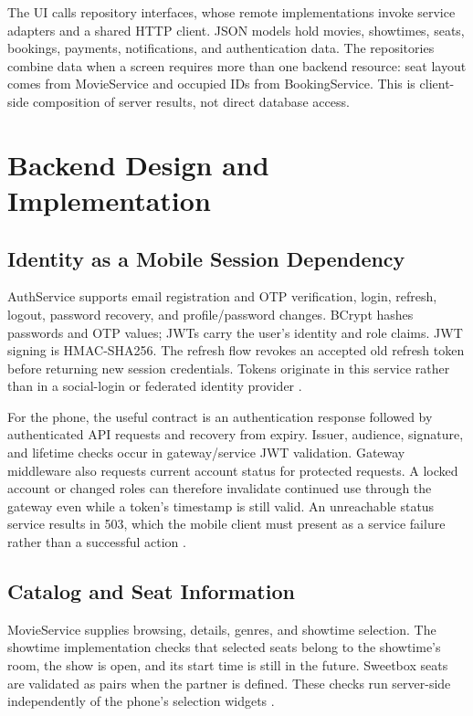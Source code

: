 \documentclass[conference]{IEEEtran}
\begin{document}
The UI calls repository interfaces, whose remote implementations invoke service
adapters and a shared HTTP client. JSON models hold movies, showtimes, seats,
bookings, payments, notifications, and authentication data. The repositories
combine data when a screen requires more than one backend resource: seat
layout comes from MovieService and occupied IDs from BookingService. This is
client-side composition of server results, not direct database access.

\section{Backend Design and Implementation}
\subsection{Identity as a Mobile Session Dependency}
AuthService supports email registration and OTP verification, login, refresh,
logout, password recovery, and profile/password changes. BCrypt hashes
passwords and OTP values; JWTs carry the user's identity and role claims.
JWT signing is HMAC-SHA256. The refresh flow revokes an accepted old refresh
token before returning new session credentials. Tokens originate in this
service rather than in a social-login or federated identity provider
\cite{auth}.

For the phone, the useful contract is an authentication response followed by
authenticated API requests and recovery from expiry. Issuer, audience,
signature, and lifetime checks occur in gateway/service JWT validation.
Gateway middleware also requests current account status for protected
requests. A locked account or changed roles can therefore invalidate continued
use through the gateway even while a token's timestamp is still valid. An
unreachable status service results in 503, which the mobile client must present
as a service failure rather than a successful action \cite{gateway,jwt}.

\subsection{Catalog and Seat Information}
MovieService supplies browsing, details, genres, and showtime selection. The
showtime implementation checks that selected seats belong to the showtime's
room, the show is open, and its start time is still in the future. Sweetbox
seats are validated as pairs when the partner is defined. These checks run
server-side independently of the phone's selection widgets \cite{movie}.
\end{document}
